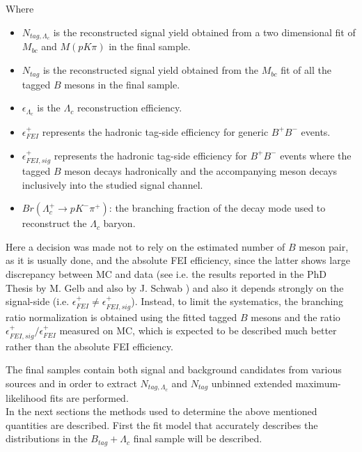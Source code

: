 Where 
\begin{itemize}

\item $N_{tag, \Lambda_c} $ is the reconstructed signal yield obtained from a two dimensional fit of $M_{bc}$ and $M(p K \pi)$ in the final sample.
\item ${N_{tag}}$ is the reconstructed signal yield obtained from the $M_{bc}$ fit of all the tagged $B$ mesons in the final sample.
\item $\epsilon_{\Lambda_c} $ is the $\Lambda_c$ reconstruction efficiency.
\item $\epsilon^{+}_{FEI}$ represents the hadronic tag-side efficiency for generic $B^+B^- $ events. 
\item $\epsilon^{+}_{FEI,  sig}$ represents the hadronic tag-side efficiency for  $B^+B^-$ events where the tagged $B$ meson decays hadronically and the accompanying meson decays inclusively into the studied signal channel. 
\item  $Br(\Lambda_c^+ \rightarrow  p K^- \pi^+) $: the branching fraction of the decay mode used to reconstruct the  $\Lambda_c$ baryon.
\end{itemize}
\vspace{0.2 cm}
Here a decision was made not to rely on the estimated number of $B$ meson pair, as it is usually done, and the absolute FEI efficiency, since the latter shows large discrepancy between MC and data (see i.e. the results reported in the PhD Thesis by M. Gelb \cite{gelb_moritz_2018_21546} and also by J. Schwab \cite{schwab_judith_2017_21422} ) and also it depends strongly on the signal-side (i.e. $\epsilon^{+}_{FEI} \neq \epsilon^{+}_{FEI,  sig}$). Instead, to limit the systematics, the branching ratio normalization is obtained using the fitted tagged $B$ mesons and the ratio $\epsilon^{+}_{FEI,  sig} / \epsilon^{+}_{FEI}$ measured on MC, which is expected to be described much better rather than the absolute FEI efficiency.  

The final samples contain both signal and background candidates
from various sources and in order to extract $N_{tag, \Lambda_c} $ and ${N_{tag}}$  unbinned extended maximum-likelihood fits are performed.  \\
In the next sections the methods used to determine the above mentioned quantities are described. First the fit model that accurately describes the   distributions in the $B_{tag}+\Lambda_c$ final sample will be described.

\vspace{0.5 cm}

